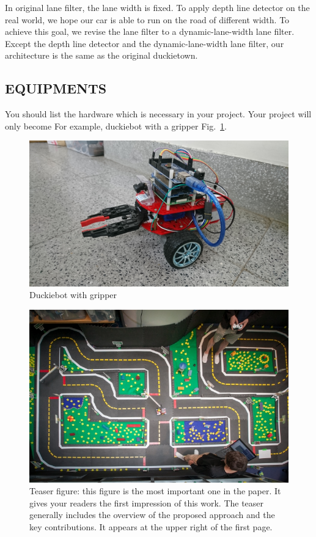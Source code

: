 \documentclass[letterpaper, 10 pt, conference]{ieeeconf}  %
\begin{document}
In original lane filter, the lane width is fixed. To apply depth line detector on the real world, we hope our car is able to run on the road of different width. To achieve this goal, we revise the lane filter to a dynamic-lane-width lane filter. Except the depth line detector and the dynamic-lane-width lane filter, our architecture is the same as the original duckietown.


\subsection{EQUIPMENTS} 

You should list the hardware which is necessary in your project. Your project will only become For example, duckiebot with a gripper Fig.~\ref{figure:duckiebot_gripper}.
\begin{figure}[h] %
\includegraphics[width=0.8\columnwidth]{duckiebot_gripper}
\centering
\caption{Duckiebot with gripper}
 \label{figure:duckiebot_gripper}
\end{figure}

\begin{figure}[t] %
\includegraphics[width=0.8\columnwidth]{duck}
\centering
\caption{Teaser figure: this figure is the most important one in the paper. It gives your readers the first impression of this work. The teaser generally includes the overview of the proposed approach and the key contributions. It appears at the upper right of the first page.}
\end{figure}
\end{document}
